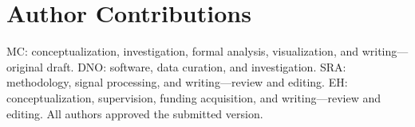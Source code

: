 \section{Author Contributions}

MC: conceptualization, investigation, formal analysis, visualization, and writing---original draft. DNO: software, data curation, and investigation. SRA: methodology, signal processing, and writing---review and editing. EH: conceptualization, supervision, funding acquisition, and writing---review and editing. All authors approved the submitted version.
